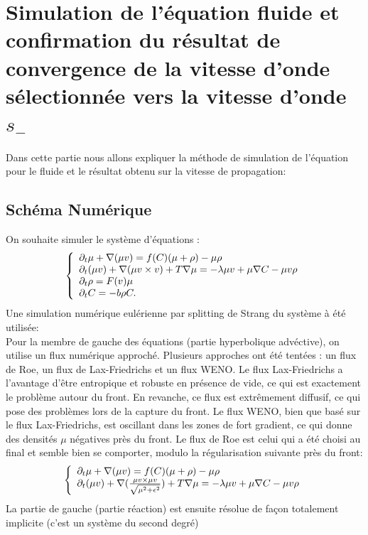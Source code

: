 \documentclass[11pt]{article}
\begin{document}
\fi

\section{Simulation de l’équation fluide et confirmation du résultat de convergence de la vitesse d'onde sélectionnée vers la vitesse d'onde $s_-$}

Dans cette partie nous allons expliquer la méthode de simulation de l’équation pour le fluide et le résultat obtenu sur la vitesse de propagation:

\subsection{Schéma Numérique}
On souhaite simuler le système d'équations :
\begin{equation}  \left \{
                \begin{array}{ll}
                \partial_t\mu + \nabla(\mu v) = f(C)(\mu + \rho) -\mu\rho \\
                   \partial_t(\mu v)+\nabla(\mu v\times v) +T\nabla\mu=-\lambda\mu v+\mu\nabla C-\mu v \rho \\
                 \partial_t\rho=  F(v) \mu \\
                  \partial_t C = -b\rho C.
                \end{array}
              \right.
\end{equation} 
Une simulation numérique eulérienne par splitting de Strang du système à été utilisée:\\ 
Pour la membre de gauche des équations (partie hyperbolique advéctive), on utilise un flux numérique approché. Plusieurs approches ont été tentées : un flux de Roe, un flux de Lax-Friedrichs et un flux WENO. Le flux Lax-Friedrichs a l'avantage d'être entropique et robuste en présence de vide, ce qui est exactement le problème autour du front. En revanche, ce flux est extrêmement diffusif, ce qui pose des problèmes lors de la capture du front. Le flux WENO, bien que basé sur le flux Lax-Friedrichs, est oscillant dans les zones de fort gradient, ce qui donne des densités $\mu$ négatives près du front.
Le flux de Roe est celui qui a été choisi au final et semble bien se comporter, modulo la régularisation suivante près du front:
\begin{equation}
     \left \{ \begin{array}{ll}
\partial_t \mu + \nabla(\mu v) = f(C)(\mu + \rho) -\mu\rho \\
 \partial_t(\mu v)+\nabla(\frac{\mu v\times \mu v}{\sqrt{\mu^2 + \epsilon^2}}) +T\nabla\mu=-\lambda\mu v+\mu\nabla C-\mu v \rho 
 \end{array}
 \right.
\end{equation}
La partie de gauche (partie réaction) est ensuite résolue de façon totalement implicite (c'est un système du second degré)
\newpage
\end{document}
